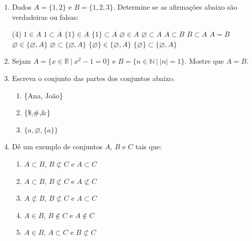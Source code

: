 \documentclass[a4paper,5pt]{amsbook}
\begin{document}
\vspace{1cm}
\begin{enumerate}
    \vspace{0.5cm}
    \item Dados $A=\{1,2\}$ e $B=\{1,2,3\}$. Determine se as afirma\c{c}\~oes abaixo
        s\~ao verdadeiras ou falsas:
        \begin{tasks}[style=enumerate, counter-format={(tsk[a])}, label-offset={0.25cm}](4)
            \task $1\in A$
            \task $1\subset A$
            \task $\{1\}\in A$
            \task $\{1\}\subset A$
            \task $\varnothing \in A$
            \task $\varnothing \subset A$
            \task $A\subset B$
            \task $B\subset A$
            \task $A=B$
            \task $\varnothing\in\{\varnothing, A\}$
            \task $\varnothing\subset\{\varnothing, A\}$
            \task $\{\varnothing\}\in\{\varnothing, A\}$
            \task $\{\varnothing\}\subset\{\varnothing, A\}$
        \end{tasks}

    \vspace{0.5cm}
    \item Sejam $A=\{x\in\mathbb{R}\ |\ x^2-1=0\}$ e $B=\{n\in\mathbb{N}\ |\
        |n|=1\}$. Mostre que $A=B$.

    \vspace{0.5cm}
    \item Escreva o conjunto das partes dos conjuntos abaixo.
        \begin{enumerate}
            \setlength\itemsep{0.2cm}
            \item \{Ana, Jo\~ao\}
            \item \{\$,\#,\&\}
            \item $\{a, \varnothing, \{a\}\}$
        \end{enumerate}

    \vspace{0.5cm}
    \item D\^e um exemplo de conjuntos $A$, $B$ e $C$ tais que:
        \begin{enumerate}
            \setlength\itemsep{0.2cm}
            \item $A\subset B$, $B\not\subset C$ e $A\subset C$
            \item $A\subset B$, $B\not\subset C$ e $A\not\subset C$
            \item $A\not\subset B$, $B\not\subset C$ e $A\subset C$
            \item $A\in B$, $B\not\in C$ e $A\not\in C$
            \item $A\in B$, $A\subset C$ e $B\not\subset C$
        \end{enumerate}
\end{enumerate}
\end{document}
